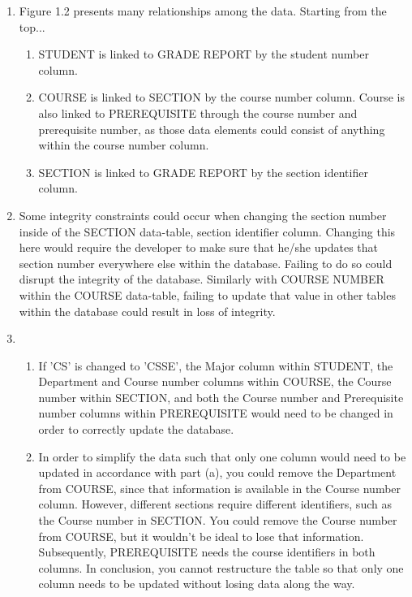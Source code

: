 \documentclass[12pt]{article}
\begin{document}
\begin{enumerate}
	\item Figure 1.2 presents many relationships among the data. Starting from the top...
	\begin{enumerate}
		\item STUDENT is linked to GRADE REPORT by the student number column.
		\item COURSE is linked to SECTION by the course number column. Course is also 				linked to PREREQUISITE through the course number and prerequisite number, as those 		data elements could consist of anything within the course number column.
		\item SECTION is linked to GRADE REPORT by the section identifier column.	
	\end{enumerate}
	
	\item Some integrity constraints could occur when changing the section number inside 		of the SECTION data-table, section identifier column. Changing this here would require 	the developer to make sure that he/she updates that section number everywhere else 			within the database. Failing to do so could disrupt the integrity of the database. 			Similarly with COURSE NUMBER within the COURSE data-table, failing to update that 			value in other tables within the database could result in loss of integrity.
	
	\item 
	\begin{enumerate}
		\item If 'CS' is changed to 'CSSE', the Major column within STUDENT, the 					Department and  Course number columns within COURSE, the Course number within 				SECTION, and both the Course number and  Prerequisite number columns within 				PREREQUISITE would need to be changed in order to correctly update the database.
		\item In order to simplify the data such that only one column would need to be 				updated in accordance with part (a), you could remove the Department from COURSE, 			since that information is available in the Course number column. However, 					different sections require different identifiers, such as the Course number in 				SECTION. You could remove the Course number from COURSE, but it wouldn't be ideal 			to lose that information. Subsequently, PREREQUISITE needs the course identifiers 			in both columns. In conclusion, you cannot restructure the table so that only one 			column needs to be updated without losing data along the way.
	\end{enumerate}
	
\end{enumerate}
\end{document}
